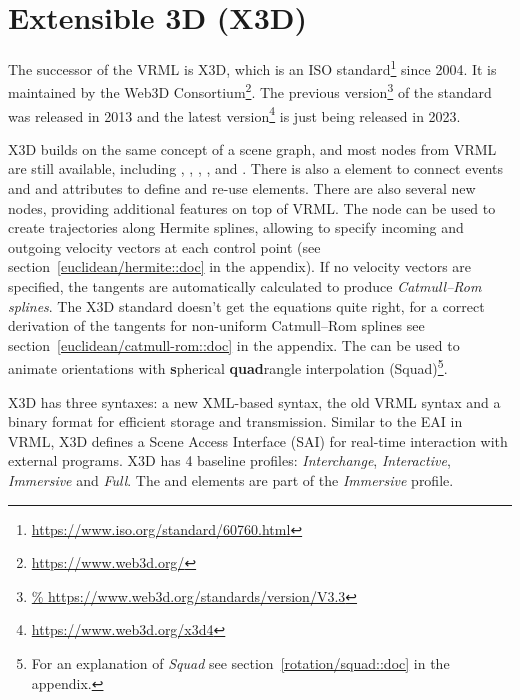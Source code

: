 \section{Extensible 3D (X3D)}
\label{sec:X3D}

The successor of the VRML is X3D,
which is an
ISO standard\footnote{\url{https://www.iso.org/standard/60760.html}}
since 2004.
It is maintained by the
Web3D Consortium\footnote{\url{https://www.web3d.org/}}.
The previous version\footnote{\url{%
https://www.web3d.org/standards/version/V3.3}}
of the standard
was released in 2013
and the latest version\footnote{\url{https://www.web3d.org/x3d4}}
is just being released in 2023.

X3D builds on the same concept of a scene graph,
and most nodes from VRML are still available,
including
,
,
,
,
 and .
There is also a  element to connect events
and  and  attributes to define and re-use elements.
There are also several new nodes, providing additional features
on top of VRML.
The
 node
can be used to create trajectories along
Hermite splines, allowing to specify incoming and outgoing velocity vectors
at each control point
(see section~\ref{euclidean/hermite::doc} in the appendix).
If no velocity vectors are specified,
the tangents are automatically calculated to produce
\emph{Catmull--Rom splines}.
The X3D standard doesn't get the equations quite right,
for a correct derivation of the tangents for non-uniform Catmull--Rom splines
see section~\ref{euclidean/catmull-rom::doc} in the appendix.
The 
can be used to animate orientations with
\textbf{s}pherical \textbf{quad}rangle interpolation (Squad)\footnote{%
For an explanation of \emph{Squad}
see section~\ref{rotation/squad::doc} in the appendix.}.

X3D has three syntaxes:
a new XML-based syntax,
the old VRML syntax and
a binary format for efficient storage and transmission.
Similar to the EAI in VRML,
X3D defines a Scene Access Interface (SAI)
for real-time interaction with external programs.
X3D has 4 baseline profiles: \emph{Interchange}, \emph{Interactive},
\emph{Immersive} and \emph{Full}.
The  and  elements
are part of the
\emph{Immersive} profile.



